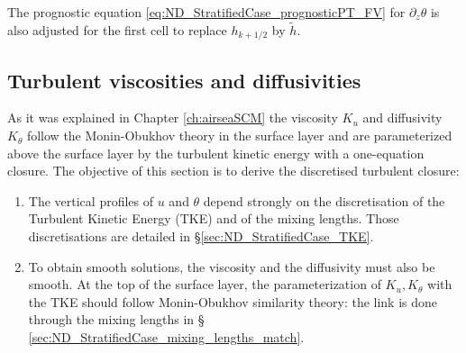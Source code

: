 The prognostic equation \eqref{eq:ND_StratifiedCase_prognosticPT_FV}
for $\partial_z \theta$ is also adjusted for the first
cell to replace $h_{k+1/2}$ by $\widetilde{h}$.
\subsection{Turbulent viscosities and diffusivities}
\label{sec:ND_StratifiedCase_turbulentVisc}
As it was explained in Chapter \ref{ch:airseaSCM} the
viscosity $K_u$ and diffusivity $K_\theta$ follow the
Monin-Obukhov theory in the surface layer and are parameterized
above the surface layer by the turbulent kinetic energy with a
one-equation closure.
The objective of this section is to derive the discretised
turbulent closure:
\begin{enumerate}
\item
The vertical profiles of $u$ and $\theta$ depend strongly on
the discretisation of the Turbulent Kinetic Energy (TKE)
and of the mixing lengths. Those discretisations are detailed in
\S \ref{sec:ND_StratifiedCase_TKE}.
\item To obtain smooth solutions, the viscosity and
the diffusivity must also be smooth.
At the top of the surface layer, the parameterization
of $K_u, K_\theta$ with the TKE should follow Monin-Obukhov
similarity theory:
the link is done through the mixing lengths in \S
\ref{sec:ND_StratifiedCase_mixing_lengths_match}.
\end{enumerate}
